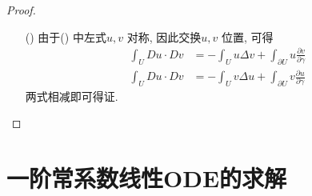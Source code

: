 \begin{corollary}
\begin{proof}
\begin{enumerate}
				\item[(\rmnum{3})] 由于() 中左式$u , v$ 对称, 因此交换$u , v$ 位置, 可得
				\begin{align}
					\int_{U} Du \cdot Dv &= -\int_{U} u \Delta v + \int_{\partial U} u \frac{\partial v}{\partial \gamma} \\
					\int_{U} Du \cdot Dv &= -\int_{U} v \Delta u + \int_{\partial U} v \frac{\partial u}{\partial \gamma}
				\end{align}
				两式相减即可得证.
			\end{enumerate}
		\end{proof}
	\end{corollary}

\newpage

\section{一阶常系数线性ODE的求解}
	
